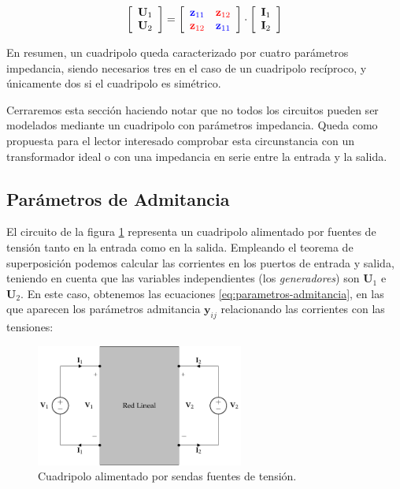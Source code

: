 \[
  \left[
    \begin{array}{c}
      \mathbf{U}_1\\
      \mathbf{U}_2
    \end{array}
  \right] =
  \left[
    \begin{array}{cc}
      \color{blue}{\mathbf{z}_{11}} & \color{red}{\mathbf{z}_{12}}\\
      \color{red}{\mathbf{z}_{12}} & \color{blue}{\mathbf{z}_{11}}
    \end{array}
  \right] \cdot
  \left[
    \begin{array}{c}
      \mathbf{I}_1\\
      \mathbf{I}_2
    \end{array}
  \right]
\]

En resumen, un cuadripolo queda caracterizado por cuatro parámetros impedancia, siendo necesarios tres en el caso de un cuadripolo recíproco, y únicamente dos si el cuadripolo es simétrico.

Cerraremos esta sección haciendo notar que no todos los circuitos pueden ser modelados mediante un cuadripolo con parámetros impedancia. Queda como propuesta para el lector interesado comprobar esta circunstancia con un transformador ideal o con una impedancia en serie entre la entrada y la salida.

\subsection{Parámetros de Admitancia}

El circuito de la figura \ref{fig:cuadripolo-admitancia} representa un cuadripolo alimentado por fuentes de tensión tanto en la entrada como en la salida. Empleando el teorema de superposición podemos calcular las corrientes en los puertos de entrada y salida, teniendo en cuenta que las variables independientes (los \emph{generadores}) son \(\mathbf{U}_1\) e \(\mathbf{U}_2\). En este caso, obtenemos las ecuaciones \ref{eq:parametros-admitancia}, en las que aparecen los parámetros admitancia $\mathbf{y}_{ij}$ relacionando las corrientes con las tensiones: 

\begin{figure}[H]
  \centering
  \includegraphics[height=4cm]{../figs/cuadripolo_fuentes_tension.pdf}
  \caption{Cuadripolo alimentado por sendas fuentes de tensión.}
  \label{fig:cuadripolo-admitancia}
\end{figure}


